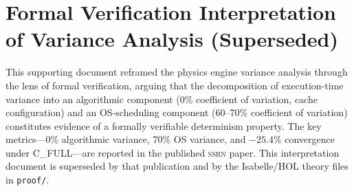 
\section*{Formal Verification Interpretation of Variance Analysis (Superseded)}

This supporting document reframed the physics engine variance analysis through
the lens of formal verification, arguing that the decomposition of execution-time
variance into an algorithmic component (0\% coefficient of variation, cache
configuration) and an OS-scheduling component (60--70\% coefficient of
variation) constitutes evidence of a formally verifiable determinism property.
The key metrics---0\% algorithmic variance, 70\% OS variance, and $-25.4\%$
convergence under C\_FULL---are reported in the published \textsc{ssrn} paper.
This interpretation document is superseded by that publication and by the
Isabelle/HOL theory files in \texttt{proof/}.
